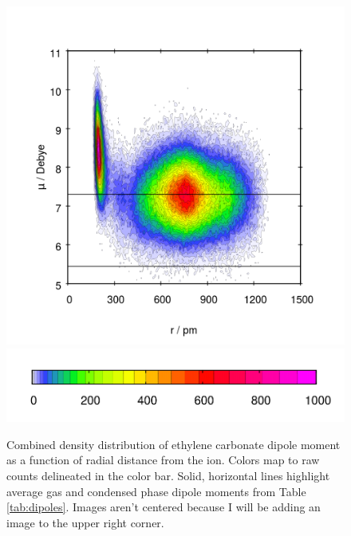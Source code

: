 \begin{ecpc}
\begin{figure}
 \begin{center}
 \includegraphics[width=0.98\linewidth]{images/ecpc/cdf_2_rdf_dipoleC3H4O3.png} \\
 \includegraphics[width=0.5\linewidth]{images/ecpc/cdf_2_rdf_dipoleC3H4O3_box.png}
 \end{center} 
 \caption[Ethylene carbonate dipoles versus distance from ion]{\label{fig:ec_cdf}Combined density distribution of ethylene 
 carbonate dipole moment as a function of radial
 distance from the ion. Colors map to raw counts delineated in the color bar. Solid, horizontal lines highlight average
 gas and condensed phase dipole moments from Table \ref{tab:dipoles}. Images aren't centered because I will be adding an 
 image to the upper right corner.}
\end{figure}


\end{ecpc}
